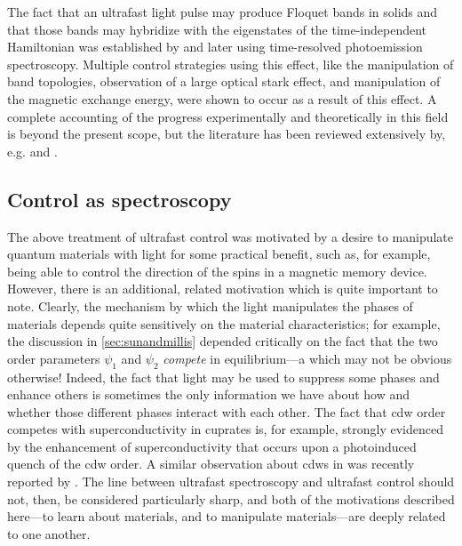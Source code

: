 The fact that an ultrafast light pulse may produce Floquet bands in solids and that those bands may hybridize with the eigenstates of the time-independent Hamiltonian was established by \citet{wang_observation_2013} and later \citet{mahmood_selective_2016} using time-resolved photoemission spectroscopy.
Multiple control strategies using this effect, like the manipulation of band topologies\citep{mciver_light-induced_2020}, observation of a large optical stark effect\citep{sie_valley-selective_2015}, and manipulation of the magnetic exchange energy\citep{batignani_probing_2015}, were shown to occur as a result of this effect.
A complete accounting of the progress experimentally and theoretically in this field is beyond the present scope, but the literature has been reviewed extensively by, e.g. \citet{de_la_torre_colloquium_2021} and \citet{oka_floquet_2019}.

\subsection{Control as spectroscopy}

The above treatment of ultrafast control was motivated by a desire to manipulate quantum materials with light for some practical benefit, such as, for example, being able to control the direction of the spins in a magnetic memory device.
However, there is an additional, related motivation which is quite important to note.
Clearly, the mechanism by which the light manipulates the phases of materials depends quite sensitively on the material characteristics; for example, the discussion in \cref{sec:sunandmillis} depended critically on the fact that the two order parameters $\psi_1$ and $\psi_2$ \emph{compete} in equilibrium---a which may not be obvious otherwise!
Indeed, the fact that light may be used to suppress some phases and enhance others is sometimes the only information we have about how and whether those different phases interact with each other.
The fact that \gls{cdw} order competes with superconductivity in cuprates is, for example, strongly evidenced by the enhancement of superconductivity that occurs upon a photoinduced quench of the \gls{cdw} order\citep{fausti_light-induced_2011}.
A similar observation about \glspl{cdw} in  was recently reported by \citet{ning_dynamical_2024}.
The line between ultrafast spectroscopy and ultrafast control should not, then, be considered particularly sharp, and both of the motivations described here---to learn about materials, and to manipulate materials---are deeply related to one another.
